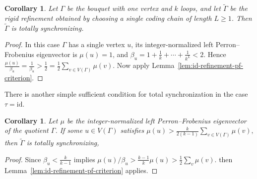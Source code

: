 \documentclass[a4paper,10pt]{amsart}
\theoremstyle{plain}
\newtheorem{corollary}[theorem]{Corollary}
\theoremstyle{definition}
\newcommand{\id}{\mathrm{id}}
\begin{document}
\begin{corollary}\label{cor:bouquet-rigidification-ts}
Let $\Gamma$ be the bouquet with one vertex and $k$ loops, and let $\widetilde\Gamma$ be the rigid refinement obtained by choosing a single coding chain of length $L\ge 1$. Then $\widetilde\Gamma$ is totally synchronizing.
\end{corollary}
\begin{proof}
In this case $\Gamma$ has a single vertex $u$, its integer-normalized left Perron--Frobenius eigenvector is $\mu(u)=1$, and $\beta_u=1+\frac1k+\cdots+\frac1{k^L}<2$. Hence
\(
\frac{\mu(u)}{\beta_u}=\frac1{\beta_u}>\frac12=\frac12\sum_{v\in V(\Gamma)}\mu(v).
\)
Now apply Lemma~\ref{lem:id-refinement-pf-criterion}.
\end{proof}

There is another simple sufficient condition for total synchronization in the case $\tau=\id$.
\begin{corollary}
Let $\mu$ be the integer-normalized left Perron--Frobenius eigenvector of the quotient $\Gamma$.
If some $u\in V(\Gamma)$ satisfies
\(
\mu(u)>\frac{k}{2(k-1)}\sum_{v\in V(\Gamma)}\mu(v),
\)
then $\widetilde\Gamma$ is totally synchronizing, 
\end{corollary}
\begin{proof}
Since $\beta_u<\frac{k}{k-1}$ implies
$\mu(u)/\beta_u>\frac{k-1}{k}\mu(u)>\frac12\sum_v\mu(v)$. then Lemma~\ref{lem:id-refinement-pf-criterion} applies.
\end{proof}
\end{document}
